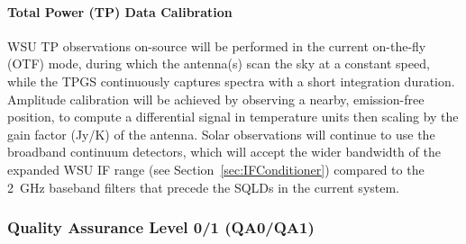 \paragraph{Total Power (TP) Data Calibration}
WSU TP observations on-source will be performed in the current
on-the-fly (OTF) mode, during which the antenna(s) scan the sky at a constant speed, while the TPGS continuously captures spectra with a short integration duration.
Amplitude calibration will be achieved by observing a nearby, emission-free
position, to compute a differential signal in temperature units then scaling by the gain factor (Jy/K) of the antenna.   Solar observations will continue to use 
the broadband continuum detectors, which will accept the wider bandwidth of
the expanded WSU IF range (see Section~\ref{sec:IFConditioner}) compared to the 2~GHz baseband filters that precede the
SQLDs in the current system.


\subsubsection{Quality Assurance Level 0/1 (QA0/QA1)}
\label{sec:QA01}


